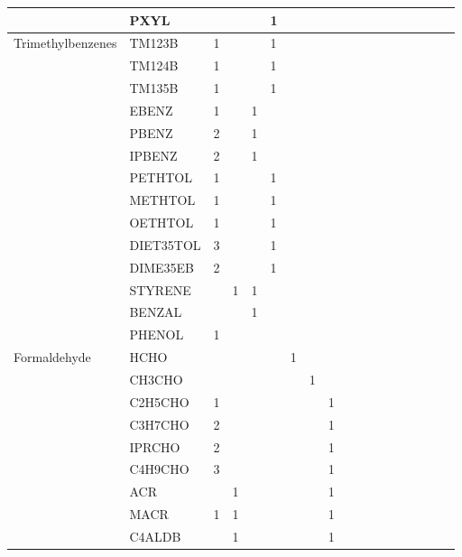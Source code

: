 \begin{longtable}{llllllllllllllllll}
	 & PXYL &  &  &  & 1 &  &  &  &  &  &  &  &  &  &  &  & \\
	\hline \multirow{3}{*}{Trimethylbenzenes} & TM123B & 1 &  &  & 1 &  &  &  &  &  &  &  &  &  &  &  & \\
	 & TM124B & 1 &  &  & 1 &  &  &  &  &  &  &  &  &  &  &  & \\
	 & TM135B & 1 &  &  & 1 &  &  &  &  &  &  &  &  &  &  &  & \\
	\hline \parbox[t]{2mm}{} & EBENZ & 1 &  & 1 &  &  &  &  &  &  &  &  &  &  &  &  & \\*
	 & PBENZ & 2 &  & 1 &  &  &  &  &  &  &  &  &  &  &  &  & \\*
	 & IPBENZ & 2 &  & 1 &  &  &  &  &  &  &  &  &  &  &  &  & \\*
	 & PETHTOL & 1 &  &  & 1 &  &  &  &  &  &  &  &  &  &  &  & \\*
	 & METHTOL & 1 &  &  & 1 &  &  &  &  &  &  &  &  &  &  &  & \\*
	 & OETHTOL & 1 &  &  & 1 &  &  &  &  &  &  &  &  &  &  &  & \\*
	 & DIET35TOL & 3 &  &  & 1 &  &  &  &  &  &  &  &  &  &  &  & \\
	 & DIME35EB & 2 &  &  & 1 &  &  &  &  &  &  &  &  &  &  &  & \\
	 & STYRENE &  & 1 & 1 &  &  &  &  &  &  &  &  &  &  &  &  & \\
	 & BENZAL &  &  & 1 &  &  &  &  &  &  &  &  &  &  &  &  & \\
	 & PHENOL & 1 &  &  &  &  &  &  &  &  &  &  &  &  &  &  & \\
	\hline Formaldehyde & HCHO &  &  &  &  & 1 &  &  &  &  &  &  &  &  &  &  & \\ \hline
	\parbox[t]{2mm}{} & CH3CHO &  &  &  &  &  & 1 &  &  &  &  &  &  &  &  &  & \\
	 & C2H5CHO & 1 &  &  &  &  &  & 1 &  &  &  &  &  &  &  &  & \\
	 & C3H7CHO & 2 &  &  &  &  &  & 1 &  &  &  &  &  &  &  &  & \\
	 & IPRCHO & 2 &  &  &  &  &  & 1 &  &  &  &  &  &  &  &  & \\
	 & C4H9CHO & 3 &  &  &  &  &  & 1 &  &  &  &  &  &  &  &  & \\
	 & ACR &  & 1 &  &  &  &  & 1 &  &  &  &  &  &  &  &  & \\
	 & MACR & 1 & 1 &  &  &  &  & 1 &  &  &  &  &  &  &  &  & \\
	 & C4ALDB &  & 1 &  &  &  &  & 1 &  &  &  &  &  &  &  &  & \\

\end{longtable}
